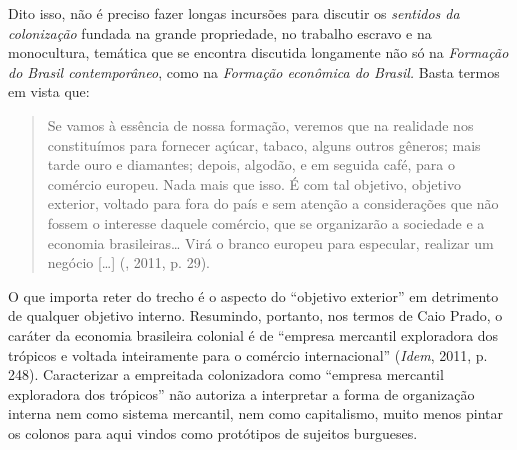 Dito isso, não é preciso fazer longas incursões para discutir os
\emph{sentidos da colonização} fundada na grande propriedade, no
trabalho escravo e na monocultura, temática que se encontra discutida
longamente não só na \emph{Formação do Brasil contemporâneo}, como na
\emph{Formação econômica do Brasil.} Basta termos em vista que:

\begin{quote}
Se vamos à essência de nossa formação, veremos que na realidade nos
constituímos para fornecer açúcar, tabaco, alguns outros gêneros; mais
tarde ouro e diamantes; depois, algodão, e em seguida café, para o
comércio europeu. Nada mais que isso. É com tal objetivo, objetivo
exterior, voltado para fora do país e sem atenção a considerações que
não fossem o interesse daquele comércio, que se organizarão a sociedade
e a economia brasileiras\ldots{} Virá o branco europeu para especular,
realizar um negócio [\ldots{}] (, 2011, p. 29).
\end{quote}

O que importa reter do trecho é o aspecto do ``objetivo exterior'' em
detrimento de qualquer objetivo interno. Resumindo, portanto, nos termos
de Caio Prado, o caráter da economia brasileira colonial é de ``empresa
mercantil exploradora dos trópicos e voltada inteiramente para o
comércio internacional'' (\emph{Idem}, 2011, p. 248). Caracterizar a
empreitada colonizadora como ``empresa mercantil exploradora dos
trópicos'' não autoriza a interpretar a forma de organização interna nem
como sistema mercantil, nem como capitalismo, muito menos pintar os
colonos para aqui vindos como protótipos de sujeitos burgueses.

